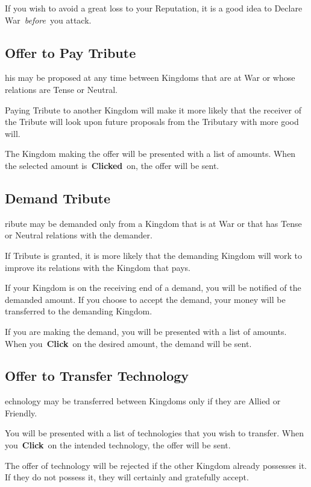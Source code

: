 If you wish to avoid a great loss to your Reputation, it is a good idea to Declare War \textit{before} you attack.

\subsection{Offer to Pay Tribute}

his may be proposed at any time between Kingdoms that are at War or whose relations are Tense or Neutral.

Paying Tribute to another Kingdom will make it more likely that the receiver of the Tribute will look upon future proposals from the Tributary with more good will.

The Kingdom making the offer will be presented with a list of amounts. When the selected amount is \textbf{Clicked} on, the offer will be sent.

\subsection{Demand Tribute}

ribute may be demanded only from a Kingdom that is at War or that has Tense or Neutral relations with the demander.

If Tribute is granted, it is more likely that the demanding Kingdom will work to improve its relations with the Kingdom that pays.

If your Kingdom is on the receiving end of a demand, you will be notified of the demanded amount. If you choose to accept the demand, your money will be transferred to the demanding Kingdom.

If you are making the demand, you will be presented with a list of amounts. When you \textbf{Click} on the desired amount, the demand will be sent.

\subsection{Offer to Transfer Technology}

echnology may be transferred between Kingdoms only if they are Allied or Friendly.

You will be presented with a list of technologies that you wish to transfer. When you \textbf{Click} on the intended technology, the offer will be sent.

The offer of technology will be rejected if the other Kingdom already possesses it. If they do not possess it, they will certainly and gratefully accept.


